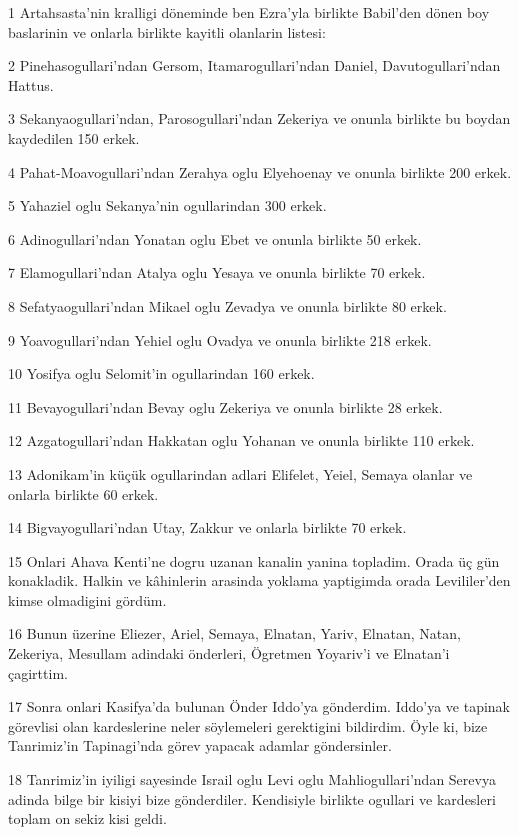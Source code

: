 \par 1 Artahsasta'nin kralligi döneminde ben Ezra'yla birlikte Babil'den dönen boy baslarinin ve onlarla birlikte kayitli olanlarin listesi:
\par 2 Pinehasogullari'ndan Gersom, Itamarogullari'ndan Daniel, Davutogullari'ndan Hattus.
\par 3 Sekanyaogullari'ndan, Parosogullari'ndan Zekeriya ve onunla birlikte bu boydan kaydedilen 150 erkek.
\par 4 Pahat-Moavogullari'ndan Zerahya oglu Elyehoenay ve onunla birlikte 200 erkek.
\par 5 Yahaziel oglu Sekanya'nin ogullarindan 300 erkek.
\par 6 Adinogullari'ndan Yonatan oglu Ebet ve onunla birlikte 50 erkek.
\par 7 Elamogullari'ndan Atalya oglu Yesaya ve onunla birlikte 70 erkek.
\par 8 Sefatyaogullari'ndan Mikael oglu Zevadya ve onunla birlikte 80 erkek.
\par 9 Yoavogullari'ndan Yehiel oglu Ovadya ve onunla birlikte 218 erkek.
\par 10 Yosifya oglu Selomit'in ogullarindan 160 erkek.
\par 11 Bevayogullari'ndan Bevay oglu Zekeriya ve onunla birlikte 28 erkek.
\par 12 Azgatogullari'ndan Hakkatan oglu Yohanan ve onunla birlikte 110 erkek.
\par 13 Adonikam'in küçük ogullarindan adlari Elifelet, Yeiel, Semaya olanlar ve onlarla birlikte 60 erkek.
\par 14 Bigvayogullari'ndan Utay, Zakkur ve onlarla birlikte 70 erkek.
\par 15 Onlari Ahava Kenti'ne dogru uzanan kanalin yanina topladim. Orada üç gün konakladik. Halkin ve kâhinlerin arasinda yoklama yaptigimda orada Levililer'den kimse olmadigini gördüm.
\par 16 Bunun üzerine Eliezer, Ariel, Semaya, Elnatan, Yariv, Elnatan, Natan, Zekeriya, Mesullam adindaki önderleri, Ögretmen Yoyariv'i ve Elnatan'i çagirttim.
\par 17 Sonra onlari Kasifya'da bulunan Önder Iddo'ya gönderdim. Iddo'ya ve tapinak görevlisi olan kardeslerine neler söylemeleri gerektigini bildirdim. Öyle ki, bize Tanrimiz'in Tapinagi'nda görev yapacak adamlar göndersinler.
\par 18 Tanrimiz'in iyiligi sayesinde Israil oglu Levi oglu Mahliogullari'ndan Serevya adinda bilge bir kisiyi bize gönderdiler. Kendisiyle birlikte ogullari ve kardesleri toplam on sekiz kisi geldi.
